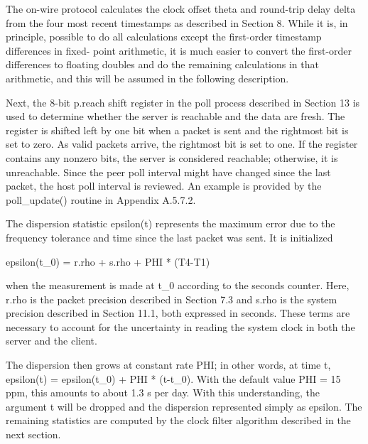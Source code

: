 The on-wire protocol calculates the clock offset theta and round-trip
delay delta from the four most recent timestamps as described in
Section 8. While it is, in principle, possible to do all
calculations except the first-order timestamp differences in fixed-
point arithmetic, it is much easier to convert the first-order
differences to floating doubles and do the remaining calculations in
that arithmetic, and this will be assumed in the following
description.

Next, the 8-bit p.reach shift register in the poll process described
in Section 13 is used to determine whether the server is reachable
and the data are fresh. The register is shifted left by one bit when
a packet is sent and the rightmost bit is set to zero. As valid
packets arrive, the rightmost bit is set to one. If the register
contains any nonzero bits, the server is considered reachable;
otherwise, it is unreachable. Since the peer poll interval might
have changed since the last packet, the host poll interval is
reviewed. An example is provided by the poll_update() routine in
Appendix A.5.7.2.

The dispersion statistic epsilon(t) represents the maximum error due
to the frequency tolerance and time since the last packet was sent.
It is initialized

epsilon(t_0) = r.rho + s.rho + PHI * (T4-T1)

when the measurement is made at t_0 according to the seconds counter.
Here, r.rho is the packet precision described in Section 7.3 and
s.rho is the system precision described in Section 11.1, both
expressed in seconds. These terms are necessary to account for the
uncertainty in reading the system clock in both the server and the
client.

The dispersion then grows at constant rate PHI; in other words, at
time t, epsilon(t) = epsilon(t_0) + PHI * (t-t_0). With the default
value PHI = 15 ppm, this amounts to about 1.3 s per day. With this
understanding, the argument t will be dropped and the dispersion
represented simply as epsilon. The remaining statistics are computed
by the clock filter algorithm described in the next section.
